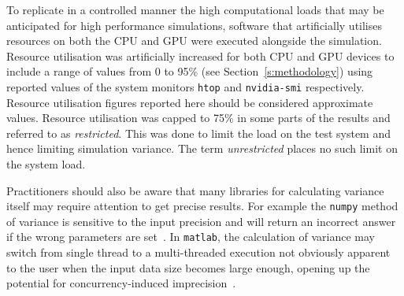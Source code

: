 \documentclass[runningheads,twocolumn,a4paper,10pt]{llncs}
\begin{document}
To replicate in a controlled manner the high computational loads that may be anticipated for high performance simulations, software that artificially utilises resources on both the CPU and GPU were executed alongside the simulation. 
%
Resource utilisation was artificially increased for both CPU and GPU devices to include a range of values from 0 to 95\% (see Section~\ref{s:methodology}) using reported values of the system monitors \texttt{htop} and \texttt{nvidia-smi} respectively. Resource utilisation figures reported here should be considered approximate values. %
Resource utilisation was capped to 75\% in some parts of the results and referred to as \textit{restricted}. This was done to limit the load on the test system and hence limiting simulation variance. The term \textit{unrestricted} places no such limit on the system load.

%
%


Practitioners should also be aware that many libraries for calculating variance itself may require attention to get precise results. For example the \texttt{numpy} method of variance is sensitive to the input precision and will return an incorrect answer if the wrong parameters are set~\cite{NumpyVar}. In \texttt{matlab}, the calculation of variance may switch from single thread to a multi-threaded execution not obviously apparent to the user when the input data size becomes large enough, opening up the potential for concurrency-induced imprecision~\cite{matlab_parallel_computing}. 
\end{document}

